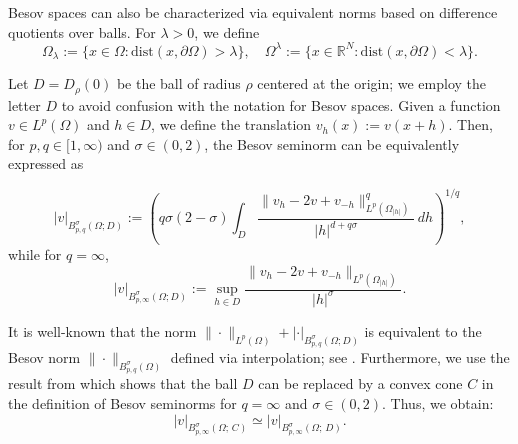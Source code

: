 \documentclass[]{amsart}
\newtheorem{proposition}[theorem]{Proposition}
\theoremstyle{definition}
\theoremstyle{definition}
\theoremstyle{remark}
\numberwithin{equation}{section}
\begin{document}
	Besov spaces can also be characterized via equivalent norms based on difference quotients over balls. For \( \lambda > 0 \), we define 
	\[
	\Omega_{\lambda} := \{x \in \Omega : \mathrm{dist}(x, \partial \Omega) > \lambda\}, \quad \Omega^{\lambda} := \{x \in \mathbb{R}^N : \mathrm{dist}(x, \partial \Omega) < \lambda\}.
	\]
	
	Let \( D = D_\rho(0) \) be the ball of radius \( \rho \) centered at the origin; we employ the letter $D$ to avoid confusion with the notation for Besov spaces. Given a function \( v \in L^p(\Omega) \) and 
    \( h \in D \), we define the translation \( v_h(x) := v(x+h) \). Then, for \( p,q \in [1, \infty) \) and \( \sigma \in (0,2) \), the Besov seminorm can be equivalently expressed as
	
\begin{equation}
\label{eq: Regularidad-Norma-Besov}
    	|v|_{B_{p, q}^{\sigma}(\Omega; D)} := \left(q \sigma(2-\sigma) \int_{D} \frac{\|v_h - 2v + v_{-h}\|_{L^{p}(\Omega_{|h|})}^{q}}{|h|^{d + q\sigma}} \, dh\right)^{1/q},
\end{equation}
	while for \( q = \infty \),
	\begin{equation}
	\label{eq: Regularidad-Norma-Besov-Inf}
	|v|_{B_{p, \infty}^{\sigma}(\Omega; D)} := \sup_{h \in D} \frac{\| v_h - 2v + v_{-h}\|_{L^p(\Omega_{|h|})}}{|h|^\sigma}.\end{equation}
	
	It is well-known that
    the norm \( \|\cdot\|_{L^p(\Omega)} + |\cdot|_{B_{p,q}^\sigma(\Omega; D)} \) is equivalent to the Besov norm \( \|\cdot\|_{B_{p,q}^\sigma(\Omega)} \) defined via interpolation; see \cite[Theorem 7.47]{adams2003jjf}. Furthermore, we use the result from \cite[Proposition 2.2]{borthagaray2023besov} which shows that the ball \( D \) can be replaced by a convex cone $C$ in the definition of Besov seminorms for \( q = \infty \) and \( \sigma \in (0,2) \). Thus, we obtain:
	\begin{equation}
		\label{Regularidad: Equivalecia normas Besov}
		|v|_{B_{p, \infty}^\sigma(\Omega; \, C)} \simeq |v|_{B_{p, \infty}^\sigma(\Omega; \, D)}.
	\end{equation}
	
	
\end{document}
